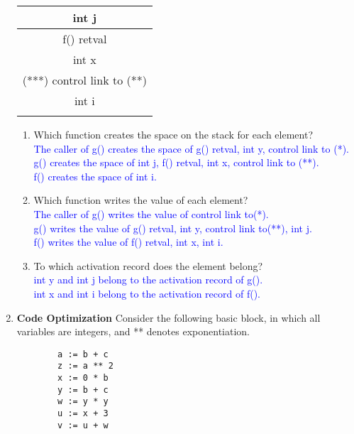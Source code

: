 \documentclass[10pt]{article}
\begin{document}
\begin{enumerate}
{\begin{tabular}{|c|}
            \hline
            int j                      \\
            \hline
            f() retval                 \\
            \hline
            int x                      \\
            \hline
            (***) control link to (**) \\
            \hline
            int i                      \\
            \hline
            \\
          \end{tabular}
        }
        \begin{enumerate}
          \item Which function creates the space on the stack for each element?
                \textcolor{blue}{\\
                  The caller of g() creates the space of g() retval, int y, control link to (*).\\
                  g() creates the space of int j, f() retval, int x, control link to (**).\\
                  f() creates the space of int i.
                }
          \item Which function writes the value of each element?
                \textcolor{blue}{\\
                  The caller of g() writes the value of control link to(*).\\
                  g() writes the value of g() retval, int y, control link to(**), int j.\\
                  f() writes the value of f() retval, int x, int i.
                }
          \item To which activation record does the element belong?
                \textcolor{blue}{\\
                  int y and int j belong to the activation record of g().\\
                  int x and int i belong to the activation record of f().
                }
        \end{enumerate}
  \item \textbf{Code Optimization} Consider the following basic block, in which all variables are integers, and
        ** denotes exponentiation.
        \begin{verbatim}
        a := b + c
        z := a ** 2
        x := 0 * b
        y := b + c
        w := y * y
        u := x + 3
        v := u + w

\end{verbatim}
\end{enumerate}
\end{document}
